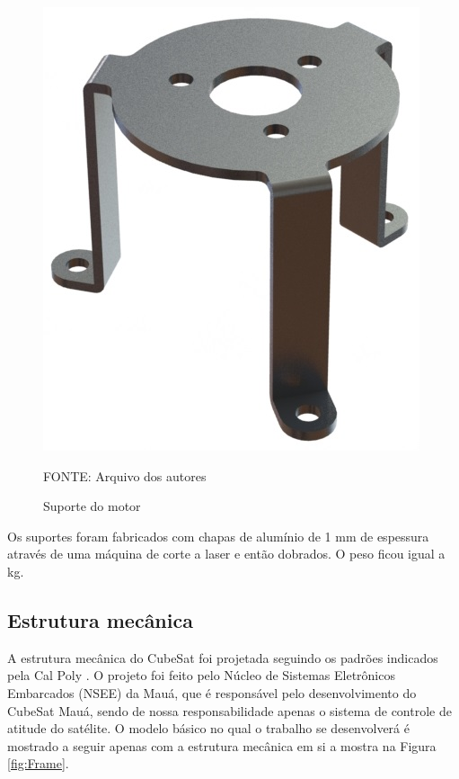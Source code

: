 \documentclass[
	12pt,				%
	openany,			%
	twoside,			%
	a4paper,			%
	english,			%
	french,				%
	spanish,			%
	brazil,				%
	oldfontcommands
	]{abntex2}
\begin{document}
\begin{figure}[th]
	\caption{Suporte do motor}
	\centering
	\includegraphics[width=0.5\linewidth]{./figs/Motor_Sup}
	
	\begin{small}
		FONTE: Arquivo dos autores
	\end{small}
	\label{fig:MS}
\end{figure}

Os suportes foram fabricados com chapas de alumínio de 1 mm de espessura através de uma máquina de corte a laser e então dobrados. O peso ficou igual a  kg.

\subsection{Estrutura mecânica}

A estrutura mecânica do CubeSat foi projetada seguindo os padrões indicados pela Cal Poly \cite{CalPoly}. O projeto foi feito pelo Núcleo de Sistemas Eletrônicos Embarcados (NSEE) da Mauá, que é responsável pelo desenvolvimento do CubeSat Mauá, sendo de nossa responsabilidade apenas o sistema de controle de atitude do satélite. O modelo básico no qual o trabalho se desenvolverá é mostrado a seguir apenas com a estrutura mecânica em si a mostra na Figura \ref{fig:Frame}.
\end{document}
